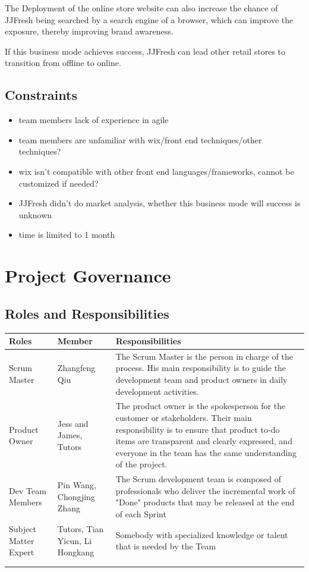 \documentclass{report}
\begin{document}
The Deployment of the online store website can also increase the chance of JJFresh being searched by a search engine of a browser, which can improve the exposure, thereby improving brand awareness.

If this business mode achieves success, JJFresh can lead other retail stores to transition from offline to online.
\section{Constraints}
\begin{itemize}
  \item team members lack of experience in agile
  \item team members are unfamiliar with wix/front end techniques/other techniques?
  \item wix isn't compatible with other front end languages/frameworks, cannot be customized if needed?
  \item JJFresh didn't do market analysis, whether this business mode will success is unknown
  \item time is limited to 1 month
\end{itemize}

\chapter{Project Governance}
\section{Roles and Responsibilities}
\begin{tabularx}{0.95\linewidth}{%
  l%
  >{\raggedright\arraybackslash}p{2.2cm}%
  >{\raggedright\arraybackslash}X}
  \toprule
  Roles & Member & Responsibilities \\
  \midrule
  Scrum Master
  & Zhangfeng Qiu
  & The Scrum Master is the person in charge of the process. His main responsibility is to guide the development team and product owners in daily development activities.
  \\
  \midrule
  Product Owner
  & Jess and James, Tutors
  & The product owner is the spokesperson for the customer or stakeholders. Their main responsibility is to ensure that product to-do items are transparent and clearly expressed, and everyone in the team has the same understanding of the project.
  \\
  \midrule
  Dev Team Members
  & Pin Wang, Chongjing Zhang
  & The Scrum development team is composed of professionals who deliver the incremental work of "Done" products that may be released at the end of each Sprint
  \\
  \midrule
  Subject Matter Expert
  & Tutors, Tian Yicun, Li Hongkang
  & Somebody with specialized knowledge or talent that is needed by the Team
  \\
  \bottomrule
  \\
  \caption{Roles and Responsibilitiest}  
  \label{tab:rolesResponsibilities}
\end{tabularx}
\end{document}
